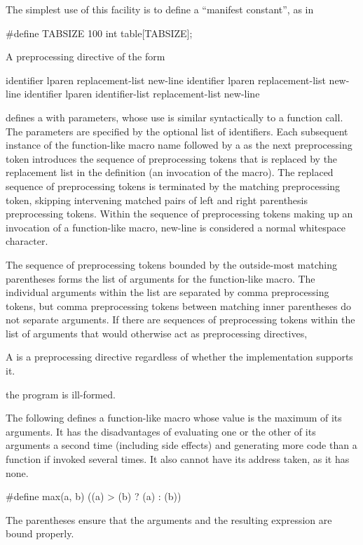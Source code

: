 \pnum
\begin{example}
The simplest use of this facility is to define a ``manifest constant'',
as in
\begin{codeblock}
#define TABSIZE 100
int table[TABSIZE];
\end{codeblock}
\end{example}

\pnum
A preprocessing directive of the form
\begin{ncsimplebnf}
 identifier lparen  \terminal{)} replacement-list new-line\br
{} identifier lparen  \terminal{)} replacement-list new-line\br
{} identifier lparen identifier-list  \terminal{)} replacement-list new-line
\end{ncsimplebnf}
defines a 
with parameters, whose use is
similar syntactically to a function call.
The parameters
%
are specified by the optional list of identifiers.
Each subsequent instance of the function-like macro name followed by a
\tcode{(}
as the next preprocessing token
introduces the sequence of preprocessing tokens that is replaced
by the replacement list in the definition
(an invocation of the macro).
%
The replaced sequence of preprocessing tokens is terminated by the matching
\tcode{)}
preprocessing token, skipping intervening matched pairs of left and
right parenthesis preprocessing tokens.
Within the sequence of preprocessing tokens making up an invocation
of a function-like macro,
new-line is considered a normal whitespace character.

\pnum
{}%
The sequence of preprocessing tokens
bounded by the outside-most matching parentheses
forms the list of arguments for the function-like macro.
The individual arguments within the list
are separated by comma preprocessing tokens,
but comma preprocessing tokens between matching
inner parentheses do not separate arguments.
If there are sequences of preprocessing tokens within the list of
arguments that would otherwise act as preprocessing directives,
\begin{footnote}
A  is a preprocessing directive regardless of whether the implementation supports it.
\end{footnote}
the program is ill-formed.

\pnum
\begin{example}
The following defines a function-like
macro whose value is the maximum of its arguments.
It has the disadvantages of evaluating one or the other of its arguments
a second time
(including
%
side effects)
and generating more code than a function if invoked several times.
It also cannot have its address taken,
as it has none.

\begin{codeblock}
#define max(a, b) ((a) > (b) ? (a) : (b))
\end{codeblock}

The parentheses ensure that the arguments and
the resulting expression are bound properly.
\end{example}

